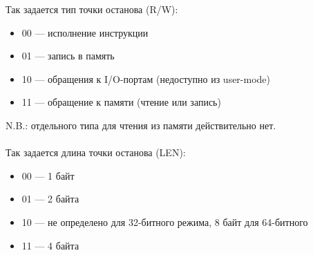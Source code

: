 Так задается тип точки останова (R/W):

\begin{itemize}
\item 00 --- исполнение инструкции
\item 01 --- запись в память
\item 10 --- обращения к I/O-портам (недоступно из user-mode)
\item 11 --- обращение к памяти (чтение или запись)
\end{itemize}

N.B.: отдельного типа для чтения из памяти действительно нет. \\
\\
Так задается длина точки останова (LEN):

\begin{itemize}
\item 00 --- 1 байт
\item 01 --- 2 байта
\item 10 --- не определено для 32-битного режима, 8 байт для 64-битного
\item 11 --- 4 байта
\end{itemize}
